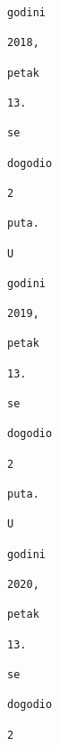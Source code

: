 \documentclass{exam}
\begin{document}
\begin{itemize}
\begin{lstlisting}[caption={Ispis}]
                                                                                                    godini
                                                                                                    2018,
                                                                                                    petak
                                                                                                    13.
                                                                                                    se
                                                                                                    dogodio
                                                                                                    2
                                                                                                    puta.
                                                                                                    U
                                                                                                    godini
                                                                                                    2019,
                                                                                                    petak
                                                                                                    13.
                                                                                                    se
                                                                                                    dogodio
                                                                                                    2
                                                                                                    puta.
                                                                                                    U
                                                                                                    godini
                                                                                                    2020,
                                                                                                    petak
                                                                                                    13.
                                                                                                    se
                                                                                                    dogodio
                                                                                                    2

\end{lstlisting}
\end{itemize}
\end{document}
